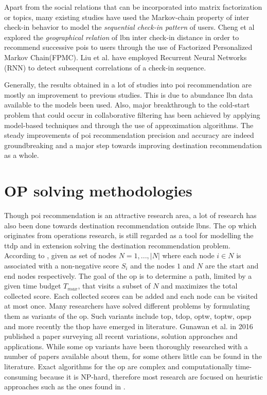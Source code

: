 Apart from the social relations that can be incorporated into matrix factorization or topics, many existing studies have used the Markov-chain property of inter check-in behavior to model the \textit{sequential check-in pattern} of users\parencite{Cheng2013WhereRecommendation, Zhao2016STELLAR:Recommendation, YangACoRR}. Cheng et al explored the \textit{geographical relation} of \gls{lbn} inter check-in distance in order to recommend successive \glspl{poi} to users through the use of Factorized Personalized Markov Chain(FPMC). Liu et al.\parencite{LiuPredictingContexts} have employed Recurrent Neural Networks (RNN) to detect subsequent correlations of a check-in sequence. 

Generally, the results obtained in a lot of studies into \gls{poi} recommendation are mostly an improvement to previous studies. This is due to abundance \gls{lbn} data available to the models been used. Also, major breakthrough to the cold-start problem that could occur in collaborative filtering has been achieved by applying model-based techniques and through the use of approximation algorithms. The steady improvements of \gls{poi} recommendation precision and accuracy are indeed groundbreaking and a major step towards improving destination recommendation as a whole. 


\section{OP solving methodologies}
Though \gls{poi} recommendation is an attractive research area, a lot of research has also been done towards destination recommendation outside \glspl{lbn}. The \Gls{op} which originates from operations research, is still regarded as a tool for modelling the \gls{ttdp} and in extension solving the destination recommendation problem. According to \parencite{Vansteenwegen2011TheSurvey}, given as set of nodes $N = {1,...,|N|}$ where each node $i \in N$ is associated with a non-negative score $S_i$ and the nodes $1$ and $N$ are the start and end nodes respectively. The goal of the \gls{op} is to determine a path, limited by a given time budget $T_{max}$, that visits a subset of $N$ and maximizes the total collected score. Each collected scores can be added and each node can be visited at most once. Many researchers have solved different problems by formulating them as variants of the \gls{op}. Such variants include \gls{top}, \gls{tdop}, \gls{optw}, \gls{toptw}, \gls{opsp} and more recently the \gls{thop} have emerged in literature. Gunawan et al.\parencite{OP_Solution_Gunawan} in 2016 published a paper surveying all recent variations, solution approaches and applications. While some \gls{op} variants have been thoroughly researched with a number of papers available about them, for some others little can be found in the literature. Exact algorithms for the \gls{op} are complex and computationally time-consuming because it is NP-hard\parencite{Golden1987TheProblem}, therefore most research are focused on heuristic approaches such as the ones found in \parencite{T.1984HeuristicOrienteering, Golden1987TheProblem, Ramesh1991AnProblem,Souffriau2008AGuides}. 

